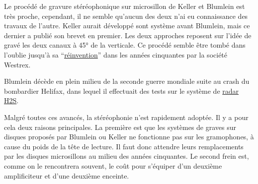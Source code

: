 \documentclass[
  letterpaper,
  DIV=11,
  numbers=noendperiod]{scrreprt}
\begin{document}
\begin{tcolorbox}[enhanced jigsaw, leftrule=.75mm, arc=.35mm, bottomtitle=1mm, colback=white, colbacktitle=quarto-callout-note-color!10!white, opacityback=0, left=2mm, rightrule=.15mm, opacitybacktitle=0.6, breakable, toptitle=1mm, titlerule=0mm, bottomrule=.15mm, toprule=.15mm, coltitle=black, title=\textcolor{quarto-callout-note-color}{\faInfo}\hspace{0.5em}{Note}]

Le procédé de gravure stéréophonique sur microsillon de Keller et
Blumlein est très proche, cependant, il ne semble qu'aucun des deux n'ai
eu connaissance des travaux de l'autre. Keller aurait développé sont
système avant Blumlein, mais ce dernier a publié son brevet en premier.
Les deux approches reposent sur l'idée de gravé les deux canaux à 45° de
la verticale. Ce procédé semble être tombé dans l'oublie jusqu'à sa
``\href{https://ieeexplore.ieee.org/document/4065276}{réinvention}''
dans les années cinquantes par la société Westrex.

\end{tcolorbox}

Blumlein décède en plein milieu de la seconde guerre mondiale suite au
crash du bombardier Helifax, dans lequel il effectuait des tests sur le
système de \href{https://en.wikipedia.org/wiki/H2S_radar}{radar H2S}.

Malgré toutes ces avancés, la stéréophonie n'est rapidement adoptée. Il
y a pour cela deux raisons principales. La première est que les systèmes
de graves sur disques proposés par Blumlein ou Keller ne fonctionne pas
sur les gramophones, à cause du poids de la tête de lecture. Il faut
donc attendre leurs remplacements par les disques microsillons au milieu
des années cinquantes. Le second frein est, comme on le rencontrera
souvent, le coût pour s'équiper d'un deuxième amplificiteur et d'une
deuxième enceinte.
\end{document}
